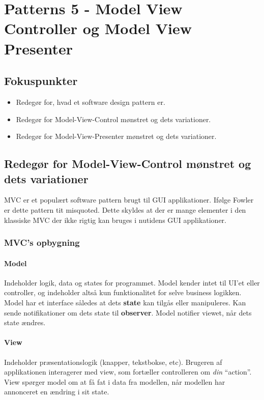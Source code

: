\section{Patterns 5 - Model View Controller og Model View Presenter}

\subsection{Fokuspunkter}

\begin{itemize}
	\item Redegør for, hvad et software design pattern er.
	\item Redegør for Model-View-Control mønstret og dets variationer.
	\item Redegør for Model-View-Presenter mønstret og dets variationer.
\end{itemize}



\subsection{Redegør for Model-View-Control mønstret og dets variationer}
MVC er et populært software pattern brugt til GUI applikationer. Ifølge Fowler er dette pattern tit misquoted. Dette skyldes at der er mange elementer i den klassiske MVC der ikke rigtig kan bruges i nutidens GUI applikationer.

\subsubsection{MVC's opbygning}
\paragraph{Model} Indeholder logik, data og states for programmet. Model kender intet til UI’et eller controller, og indeholder altså kun funktionalitet for selve business logikken. Model har et interface således at dets \textbf{state} kan tilgås eller manipuleres. Kan sende notifikationer om dets state til \textbf{observer}. Model notifier viewet, når dets state ændres.

\paragraph{View} Indeholder præsentationslogik (knapper, tekstbokse, etc). Brugeren af applikationen interagerer med view, som fortæller controlleren om \textit{din} “action”. View spørger model om at få fat i data fra modellen, når modellen har annonceret en ændring i sit state.

